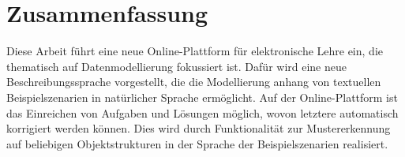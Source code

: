 \chapter*{Zusammenfassung}


Diese Arbeit führt eine neue Online-Plattform für elektronische Lehre ein, die thematisch auf Datenmodellierung fokussiert ist.
Dafür wird eine neue Beschreibungssprache vorgestellt, die die Modellierung anhang von textuellen Beispielszenarien in natürlicher Sprache ermöglicht.
Auf der Online-Plattform ist das Einreichen von Aufgaben und Lösungen möglich, wovon letztere automatisch korrigiert werden können.
Dies wird durch Funktionalität zur Mustererkennung auf beliebigen Objektstrukturen in der Sprache der Beispielszenarien realisiert.
